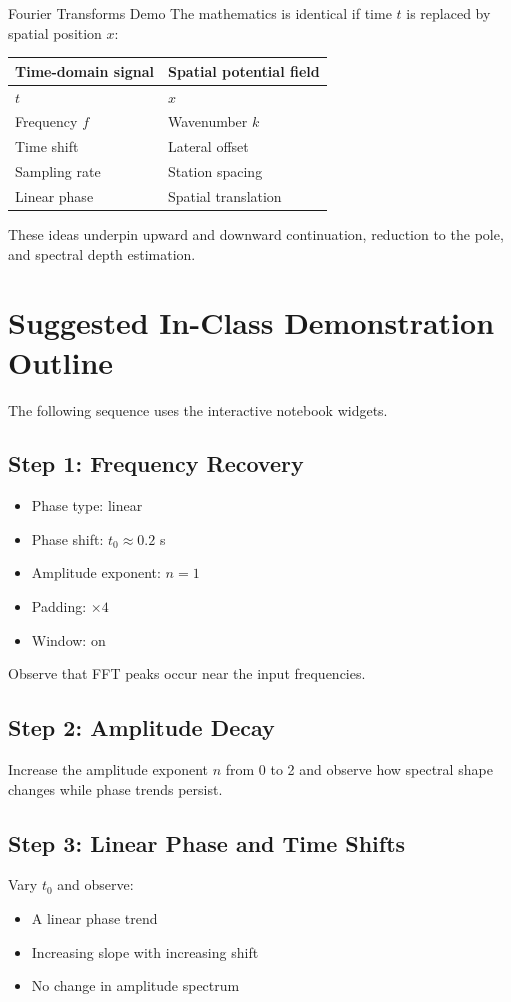 \begin{activity}{Fourier Transforms Demo}
The mathematics is identical if time $t$ is replaced by spatial position $x$:
\begin{table}
    \centering
    \begin{tabular}{ll}
        \toprule
        \textbf{Time-domain signal} &
        \textbf{Spatial potential field} \\
        \midrule
        $t$ & $x$ \\
        Frequency $f$ & Wavenumber $k$ \\
        Time shift & Lateral offset \\
        Sampling rate & Station spacing \\
        Linear phase & Spatial translation \\
        \bottomrule
    \end{tabular}
\end{table}

These ideas underpin upward and downward continuation, reduction to the pole, and spectral depth estimation.

\section*{Suggested In-Class Demonstration Outline}

The following sequence uses the interactive notebook widgets.

\subsection*{Step 1: Frequency Recovery}
\begin{itemize}
  \item Phase type: linear
  \item Phase shift: $t_0 \approx 0.2$ s
  \item Amplitude exponent: $n = 1$
  \item Padding: $\times 4$
  \item Window: on
\end{itemize}
Observe that FFT peaks occur near the input frequencies.

\subsection*{Step 2: Amplitude Decay}
Increase the amplitude exponent $n$ from 0 to 2 and observe how spectral shape changes while phase trends persist.

\subsection*{Step 3: Linear Phase and Time Shifts}
Vary $t_0$ and observe:
\begin{itemize}
  \item A linear phase trend
  \item Increasing slope with increasing shift
  \item No change in amplitude spectrum
\end{itemize}


\end{activity}
